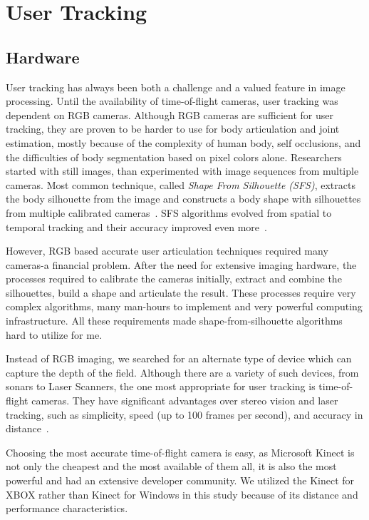 \chapter{User Tracking}
\label{appendix_user_tracking}

\section{Hardware}

User tracking has always been both a challenge and a valued feature in image processing. Until the availability of time-of-flight cameras, user tracking was dependent on RGB cameras. Although RGB cameras are sufficient for user tracking, they are proven to be harder to use for body articulation and joint estimation, mostly because of the complexity of human body, self occlusions, and the difficulties of body segmentation based on pixel colors alone. Researchers started with still images, than experimented with image sequences from multiple cameras. Most common technique, called {\em Shape From Silhouette (SFS)}, extracts the body silhouette from the image and constructs a body shape with silhouettes from multiple calibrated cameras~\cite{Cheung2005}. SFS algorithms evolved from spatial to temporal tracking and their accuracy improved even more~\cite{Cheung2005}. 

However, RGB based accurate user articulation techniques required many cameras-a financial problem. After the need for extensive imaging hardware, the processes required to calibrate the cameras initially, extract and combine the silhouettes, build a shape and articulate the result. These processes require very complex algorithms, many man-hours to implement and very powerful computing infrastructure. All these requirements made shape-from-silhouette algorithms hard to utilize for me.

Instead of RGB imaging, we searched for an alternate type of device which can capture the depth of the field. Although there are a variety of such devices, from sonars to Laser Scanners, the one most appropriate for user tracking is time-of-flight cameras. They have significant advantages over stereo vision and laser tracking, such as simplicity, speed (up to 100 frames per second), and accuracy in distance~\cite{Kourosh2012}.

Choosing the most accurate time-of-flight camera is easy, as Microsoft Kinect is not only the cheapest and the most available of them all, it is also the most powerful and had an extensive developer community. We utilized the Kinect for XBOX rather than Kinect for Windows in this study because of its distance and performance characteristics.

